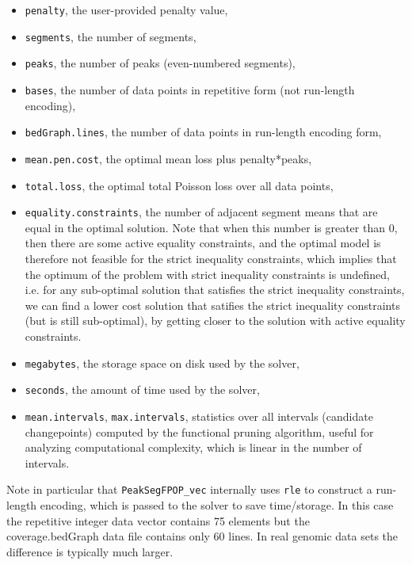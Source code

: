 \documentclass[12pt]{article}\usepackage[]{graphicx}\usepackage[]{color}
\begin{document}
\begin{itemize}
\item \verb|penalty|, the user-provided penalty value,
\item \verb|segments|, the number of segments,
\item \verb|peaks|, the number of peaks (even-numbered segments),
\item \verb|bases|, the number of data points in repetitive form (not run-length encoding),
\item \verb|bedGraph.lines|, the number of data points in run-length encoding form,
\item \verb|mean.pen.cost|, the optimal mean loss plus penalty*peaks,
\item \verb|total.loss|, the optimal total Poisson loss over all data points, 
\item \verb|equality.constraints|, the number of adjacent segment
  means that are equal in the optimal solution. Note that when this
  number is greater than 0, then there are some active equality
  constraints, and the optimal model is therefore not feasible for the
  strict inequality constraints, which implies that the optimum of the
  problem with strict inequality constraints is undefined, i.e. for
  any sub-optimal solution that satisfies the strict inequality
  constraints, we can find a lower cost solution that satifies the
  strict inequality constraints (but is still sub-optimal), by getting
  closer to the solution with active equality constraints.
\item \verb|megabytes|, the storage space on disk used by the solver,
\item \verb|seconds|, the amount of time used by the solver,
\item \verb|mean.intervals|, \verb|max.intervals|, statistics over all intervals
  (candidate changepoints) computed by the functional pruning
  algorithm, useful for analyzing computational complexity, which is
  linear in the number of intervals.
\end{itemize}
Note in particular that \verb|PeakSegFPOP_vec| internally uses \verb|rle| to
construct a run-length encoding, which is passed to the solver to save
time/storage. In this case the repetitive integer data vector contains
75 elements but the coverage.bedGraph data file
contains only 60 lines. In real genomic data
sets the difference is typically much larger.
\end{document}
